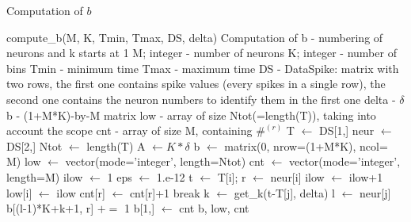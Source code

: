\documentclass{article}
\def\Tmin{T_{\min}}
\def\Tmax{T^{\max}}
\begin{document}
  \begin{algorithm}[!h]
\caption{Computation of $b$}
\begin{algorithmic}[1] 
\Use compute\_b(M, K, Tmin, Tmax, DS, delta)
  \Desc Computation of b - numbering of neurons and k starts at 1
  \Input M; integer - number of neurons
  \Input K; integer - number of bins
\Input Tmin - minimum time
\Input Tmax - maximum time
\Input DS - DataSpike: matrix with two rows, the first one contains spike values (every spikes in a single row), the second one contains the neuron numbers to identify them in the first one
\Input delta - $\delta$
\Output b - (1+M*K)-by-M matrix%
\Output low - array of size Ntot(=length(T)), taking into account the scope
\Output cnt - array of size M, containing $\#^{(r)}$
\State T $\gets$ DS[1,]  
\State neur $\gets$ DS[2,] 
\State Ntot $\gets$ length(T) 
\State A $\gets K*\delta$ 
\State b $\gets$ matrix(0, nrow=(1+M*K), ncol= M) 
\State low $\gets$ vector(mode='integer', length=Ntot) 
\State cnt $\gets$ vector(mode='integer', length=M) 
\State ilow $\gets$ 1
\State eps $\gets$ 1.e-12 
 
\State t $\gets$ T[i]; r $\gets$ neur[i]
\State ilow $\gets$ ilow+1
\EndWhile
\State low[i] $\gets$ ilow
\If{($\Tmin<t\leq\Tmax$)}
\State cnt[r] $\gets$ cnt[r]+1
\State break
\EndIf
\State k $\gets$ get\_k(t-T[j], delta) %
\State l $\gets$ neur[j]
\State b[(l-1)*K+k+1, r] $\mathrel{+}=$ 1
\EndFor
\EndIf
\EndFor
\State b[1,]  $\gets$ cnt 
\State \Return b, low, cnt
\end{algorithmic}
\end{algorithm}
\clearpage
\vspace*{-2cm}
\end{document}
